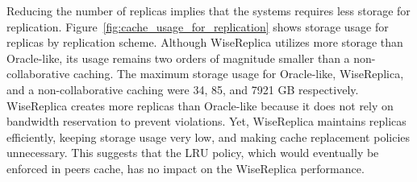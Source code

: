 Reducing the number of replicas implies that the systems requires less storage for replication. Figure~\ref{fig:cache_usage_for_replication} shows storage usage for replicas by replication scheme. Although WiseReplica utilizes more storage than Oracle-like, its usage remains two orders of magnitude smaller than a non-collaborative caching. The maximum storage usage for Oracle-like, WiseReplica, and a non-collaborative caching were 34, 85, and 7921 GB respectively. WiseReplica creates more replicas than Oracle-like because it does not rely on bandwidth reservation to prevent violations. Yet, WiseReplica maintains replicas efficiently, keeping storage usage very low, and making cache replacement policies unnecessary. This suggests that the LRU policy, which would eventually be enforced in peers cache, has no impact on the WiseReplica performance.

